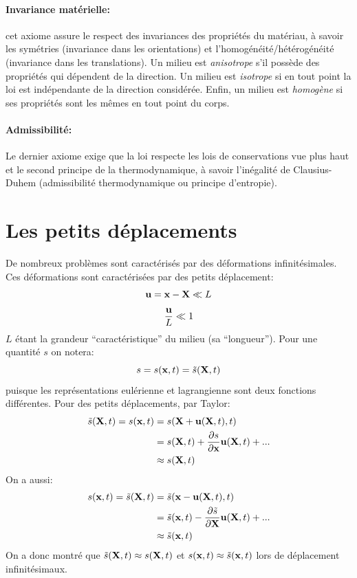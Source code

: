 \paragraph{Invariance matérielle: } cet axiome assure le respect des invariances des propriétés du matériau, à savoir les symétries (invariance dans les orientations) et  l'homogénéité/hétérogénéité (invariance dans les translations). Un milieu est \emph{anisotrope} s'il possède des propriétés qui dépendent de la direction. Un milieu est \emph{isotrope} si en tout point la loi est indépendante de la direction considérée. Enfin, un milieu est \emph{homogène} si ses propriétés sont les mêmes en tout point du corps.
\paragraph{Admissibilité: } Le dernier axiome exige que la loi respecte les lois de conservations vue plus haut et le second principe de la thermodynamique, à savoir l'inégalité de Clausius-Duhem (admissibilité thermodynamique ou principe d'entropie).

\section{Les petits déplacements}
De nombreux problèmes sont caractérisés par des déformations infinitésimales. Ces déformations sont caractérisées par des petits déplacement:
$$\textbf{u}=\textbf{x}-\textbf{X} \ll L$$ $$\frac{\textbf{u}}{L}\ll 1$$
$L$ étant la grandeur ``caractéristique''
du milieu (sa ``longueur''). Pour une quantité $s$ on notera: $$s=s(\textbf{x},t)=\tilde{s}(\textbf{X},t)$$ puisque les représentations eulérienne et lagrangienne sont deux fonctions différentes. Pour des petits déplacements, par Taylor:
\begin{align*}
\tilde{s}(\textbf{X},t)=s(\textbf{x},t)&=s(\textbf{X}+\textbf{u}(\textbf{X},t),t)\\
 & =s(\textbf{X},t)+\frac{\partial s}{\partial \textbf{x}}\textbf{u}(\textbf{X},t)+...\\
 &\approx s(\textbf{X},t)
\end{align*}
On a aussi:
\begin{align*}
s(\textbf{x},t)=\tilde{s}(\textbf{X},t)&=\tilde{s}(\textbf{x}-\textbf{u}(\textbf{X},t),t)\\
 & =\tilde{s}(\textbf{x},t)-\frac{\partial\tilde{s}}{\partial\textbf{X}}\textbf{u}(\textbf{X},t)+...\\
 &\approx \tilde{s}(\textbf{x},t)\\
\end{align*}
On a donc montré que $\tilde{s}(\textbf{X},t)\approx s(\textbf{X},t)$ et $s(\textbf{x},t)\approx\tilde{s}(\textbf{x},t)$ lors de déplacement infinitésimaux.
